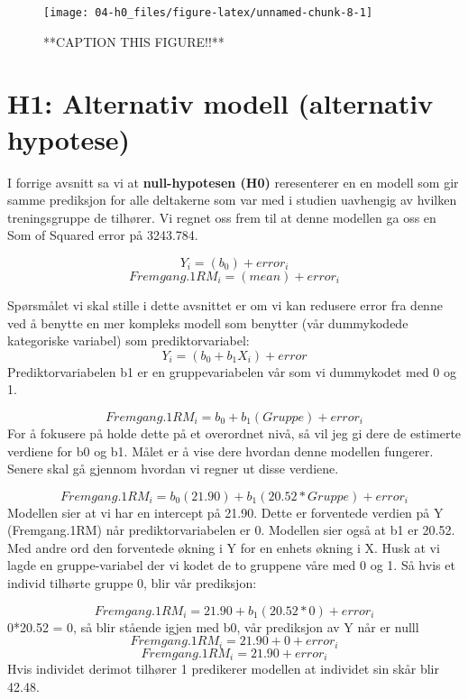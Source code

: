 \documentclass[
]{book}
\begin{document}
\begin{figure}

{\centering \texttt{[image: 04-h0\_files/figure-latex/unnamed-chunk-8-1]} 

}

\caption{**CAPTION THIS FIGURE!!**}\label{fig:unnamed-chunk-8}
\end{figure}

\hypertarget{h1-alternativ-modell-alternativ-hypotese}{%
\section{H1: Alternativ modell (alternativ hypotese)}\label{h1-alternativ-modell-alternativ-hypotese}}

I forrige avsnitt sa vi at \textbf{null-hypotesen (H0)} reresenterer en en modell som gir samme prediksjon for alle deltakerne som var med i studien uavhengig av hvilken treningsgruppe de tilhører. Vi regnet oss frem til at denne modellen ga oss en Som of Squared error på 3243.784.

\[
Y_i = (b_0) + error_i
\]
\[
Fremgang.1RM_i = (mean) + error_i
\]

Spørsmålet vi skal stille i dette avsnittet er om vi kan redusere error fra denne ved å benytte en mer kompleks modell som benytter (vår dummykodede kategoriske variabel) som prediktorvariabel:
\[
Y_i = (b_0 + b_1X_i) + error
\]
Prediktorvariabelen b1 er en gruppevariabelen vår som vi dummykodet med 0 og 1.

\[
Fremgang.1RM_i = b_0 + b_1(Gruppe) + error_i
\]
For å fokusere på holde dette på et overordnet nivå, så vil jeg gi dere de estimerte verdiene for b0 og b1. Målet er å vise dere hvordan denne modellen fungerer. Senere skal gå gjennom hvordan vi regner ut disse verdiene.

\[
Fremgang.1RM_i = b_0(21.90) + b_1(20.52*Gruppe) + error_i
\]
Modellen sier at vi har en intercept på 21.90. Dette er forventede verdien på Y (Fremgang.1RM) når prediktorvariabelen er 0. Modellen sier også at b1 er 20.52. Med andre ord den forventede økning i Y for en enhets økning i X. Husk at vi lagde en gruppe-variabel der vi kodet de to gruppene våre med 0 og 1. Så hvis et individ tilhørte gruppe 0, blir vår prediksjon:

\[
Fremgang.1RM_i = 21.90 + b_1(20.52*0) + error_i
\]
0*20.52 = 0, så blir stående igjen med b0, vår prediksjon av Y når er nulll
\[
Fremgang.1RM_i = 21.90 + 0 + error_i
\]
\[
Fremgang.1RM_i = 21.90 + error_i
\]
Hvis individet derimot tilhører 1 predikerer modellen at individet sin skår blir 42.48.
\end{document}
